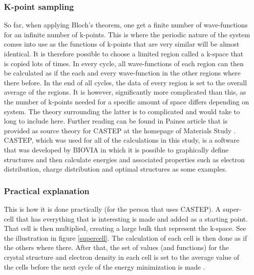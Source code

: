 \documentclass[10pt,a4paper]{article}
\begin{document}
\subsubsection{K-point sampling}
So far, when applying Bloch's theorem, one get a finite number of wave-functions for an infinite number of k-points. This is where the periodic nature of the system comes into use as the functions of k-points that are very similar will be almost identical. It is therefore possible to choose a limited region called a k-space that is copied lots of times. In every cycle, all wave-functions of each region can then be calculated as if the each and every wave-function in the other regions  where there before. In the end of all cycles, the data of every region is set to the overall average of the regions. It is however, significantly more complicated than this, as the number of k-points needed for a specific amount of space differs depending on system. The theory surrounding the latter is to complicated and would take to long to include here. Further reading can be found in Paines article that is provided as source theory for CASTEP at the homepage of Materials Study \cite{paine}. CASTEP, which was used for all of the calculations in this study, is a software that was developed by BIOVIA in which it is possible to graphically  define structures and then calculate energies and associated properties such as electron distribution, charge distribution and optimal structures as some examples. 

\subsubsection{Practical explanation}
This is how it is done practically (for the person that uses CASTEP). A super-cell that has everything that is interesting is made and added as a starting point. That cell is then multiplied, creating a large bulk that represent the k-space. See the illustration in figure \ref{supercell}. The calculation of each cell is then done as if the others where there. After that, the set of values (and functions) for the crystal structure and electron density in each cell is set to the average value of the cells before the next cycle of the energy minimization is made \cite{Castep_user_guide}.
\end{document}
